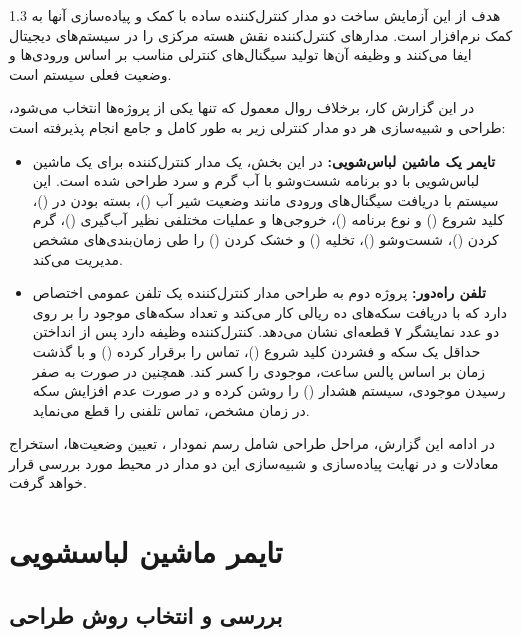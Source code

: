 \documentclass[a4paper,12pt]{article}
\numberwithin{figure}{subsection}
\begin{document}
\begin{spacing}{1.3}
هدف از این آزمایش ساخت دو مدار کنترل‌کننده ساده با کمک  و پیاده‌سازی آنها به کمک نرم‌افزار  است. مدارهای کنترل‌کننده نقش هسته مرکزی را در سیستم‌های دیجیتال ایفا می‌کنند و وظیفه آن‌ها تولید سیگنال‌های کنترلی مناسب بر اساس ورودی‌ها و وضعیت فعلی سیستم است.

در این گزارش کار، برخلاف روال معمول که تنها یکی از پروژه‌ها انتخاب می‌شود، طراحی و شبیه‌سازی هر دو مدار کنترلی زیر به طور کامل و جامع انجام پذیرفته است:

\begin{itemize}
    \item \textbf{تایمر یک ماشین لباس‌شویی:} در این بخش، یک مدار کنترل‌کننده برای یک ماشین لباس‌شویی با دو برنامه شست‌وشو با آب گرم و سرد طراحی شده است. این سیستم با دریافت سیگنال‌های ورودی مانند وضعیت شیر آب ()، بسته بودن در ()، کلید شروع () و نوع برنامه ()، خروجی‌ها و عملیات مختلفی نظیر آب‌گیری ()، گرم کردن ()، شست‌وشو ()، تخلیه () و خشک کردن () را طی زمان‌بندی‌های مشخص مدیریت می‌کند.
    
    \item \textbf{تلفن راه‌دور:} پروژه دوم به طراحی مدار کنترل‌کننده یک تلفن عمومی اختصاص دارد که با دریافت سکه‌های ده ریالی کار می‌کند و تعداد سکه‌های موجود را بر روی دو عدد نمایشگر ۷ قطعه‌ای نشان می‌دهد. کنترل‌کننده وظیفه دارد پس از انداختن حداقل یک سکه و فشردن کلید شروع ()، تماس را برقرار کرده () و با گذشت زمان بر اساس پالس ساعت، موجودی را کسر کند. همچنین در صورت به صفر رسیدن موجودی، سیستم هشدار () را روشن کرده و در صورت عدم افزایش سکه در زمان مشخص، تماس تلفنی را قطع می‌نماید.
\end{itemize}

در ادامه این گزارش، مراحل طراحی شامل رسم نمودار ، تعیین وضعیت‌ها، استخراج معادلات و در نهایت پیاده‌سازی و شبیه‌سازی این دو مدار در محیط  مورد بررسی قرار خواهد گرفت.
\end{spacing}

\newpage


\section{تایمر ماشین لباسشویی}
\leavevmode\par
\vspace{0.3cm}

\subsection{بررسی و انتخاب روش طراحی}
\leavevmode\par
\vspace{0.2cm}
\end{document}
